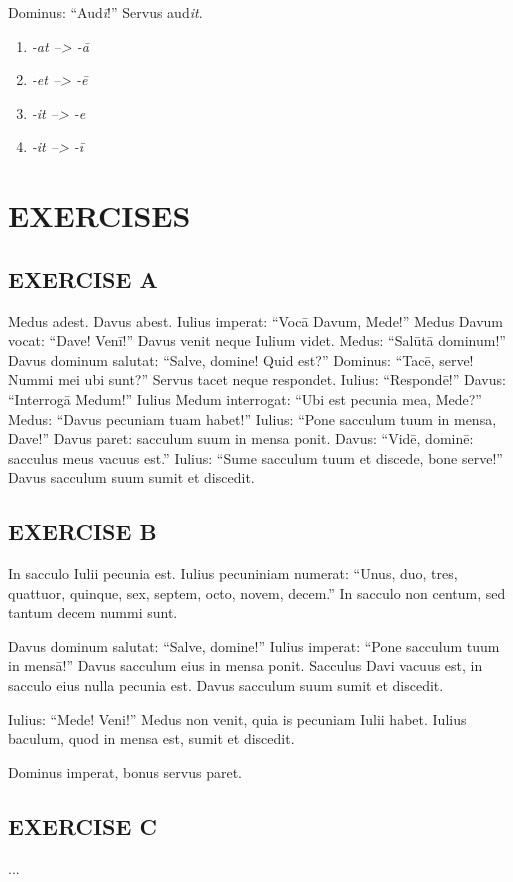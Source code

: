Dominus: ``Aud\emph{\=i}!'' Servus aud\emph{it}.

\begin{enumerate}[(1)]
  \item \emph{-at --> -\=a}
  \item \emph{-et --> -\=e}
  \item \emph{-it --> -e}
  \item \emph{-it --> -\=i}
\end{enumerate}

\section[Exercises]{EXERCISES}
\subsection*{EXERCISE A}
Medus adest. Davus abest. Iulius imperat: ``Voc\=a Davum, Mede!'' Medus Davum vocat: ``Dave! Ven\=i!'' Davus venit neque Iulium videt. Medus: ``Sal\=ut\=a dominum!'' Davus dominum salutat: ``Salve, domine! Quid est?'' Dominus: ``Tac\=e, serve! Nummi mei ubi sunt?'' Servus tacet neque respondet. Iulius: ``Respond\=e!'' Davus: ``Interrog\=a Medum!'' Iulius Medum interrogat: ``Ubi est pecunia mea, Mede?'' Medus: ``Davus pecuniam tuam habet!'' Iulius: ``Pone sacculum tuum in mensa, Dave!'' Davus paret: sacculum suum in mensa ponit. Davus: ``Vid\=e, domin\=e: sacculus meus vacuus est.'' Iulius: ``Sume sacculum tuum et discede, bone serve!'' Davus sacculum suum sumit et discedit.

\subsection*{EXERCISE B}
In sacculo Iulii pecunia est. Iulius pecuniniam numerat: ``Unus, duo, tres, quattuor, quinque, sex, septem, octo, novem, decem.'' In sacculo non centum, sed tantum decem nummi sunt.

Davus dominum salutat: ``Salve, domine!'' Iulius imperat: ``Pone sacculum tuum in mens\=a!'' Davus sacculum eius in mensa ponit. Sacculus Davi vacuus est, in sacculo eius nulla pecunia est. Davus sacculum suum sumit et discedit.

Iulius: ``Mede! Veni!'' Medus non venit, quia is pecuniam Iulii habet. Iulius baculum, quod in mensa est, sumit et discedit.

Dominus imperat, bonus servus paret.

\subsection*{EXERCISE C}
...
